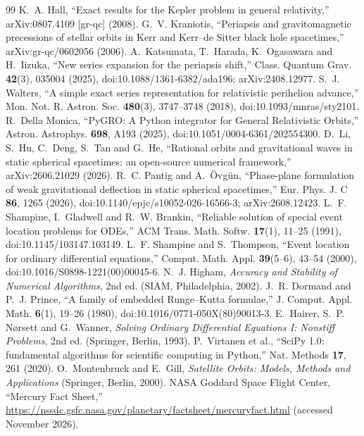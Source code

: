 \documentclass[11pt,a4paper]{article}
\begin{document}
\begin{thebibliography}{99}\small
{} K.~A. Hall, ``Exact results for the Kepler problem in general relativity,'' arXiv:0807.4109 [gr-qc] (2008).
 G.~V. Kraniotis, ``Periapsis and gravitomagnetic precessions of stellar orbits in Kerr and Kerr--de Sitter black hole spacetimes,'' arXiv:gr-qc/0602056 (2006).
 A.~Katsumata, T.~Harada, K.~Ogasawara and H.~Iizuka, ``New series expansion for the periapsis shift,'' Class. Quantum Grav. \textbf{42}(3), 035004 (2025), doi:10.1088/1361-6382/ada196; arXiv:2408.12977.
 S.~J. Walters, ``A simple exact series representation for relativistic perihelion advance,'' Mon. Not. R. Astron. Soc. \textbf{480}(3), 3747--3748 (2018), doi:10.1093/mnras/sty2101.
 R.~Della Monica, ``PyGRO: A Python integrator for General Relativistic Orbits,'' Astron. Astrophys. \textbf{698}, A193 (2025), doi:10.1051/0004-6361/202554300.
 D.~Li, S.~Hu, C.~Deng, S.~Tan and G.~He, ``Rational orbits and gravitational waves in static spherical spacetimes: an open-source numerical framework,'' arXiv:2606.21029 (2026).
 R.~C. Pantig and A.~\"Ovg\"un, ``Phase-plane formulation of weak gravitational deflection in static spherical spacetimes,'' Eur. Phys. J. C \textbf{86}, 1265 (2026), doi:10.1140/epjc/s10052-026-16566-3; arXiv:2608.12423.
 L.~F. Shampine, I.~Gladwell and R.~W. Brankin, ``Reliable solution of special event location problems for ODEs,'' ACM Trans. Math. Softw. \textbf{17}(1), 11--25 (1991), doi:10.1145/103147.103149.
 L.~F. Shampine and S.~Thompson, ``Event location for ordinary differential equations,'' Comput. Math. Appl. \textbf{39}(5--6), 43--54 (2000), doi:10.1016/S0898-1221(00)00045-6.
 N.~J. Higham, \emph{Accuracy and Stability of Numerical Algorithms}, 2nd ed. (SIAM, Philadelphia, 2002).
 J.~R. Dormand and P.~J. Prince, ``A family of embedded Runge--Kutta formulae,'' J. Comput. Appl. Math. \textbf{6}(1), 19--26 (1980), doi:10.1016/0771-050X(80)90013-3.
 E.~Hairer, S.~P. N{\o}rsett and G.~Wanner, \emph{Solving Ordinary Differential Equations I: Nonstiff Problems}, 2nd ed. (Springer, Berlin, 1993).
 P.~Virtanen et al., ``SciPy 1.0: fundamental algorithms for scientific computing in Python,'' Nat. Methods \textbf{17}, 261 (2020).
 O.~Montenbruck and E.~Gill, \emph{Satellite Orbits: Models, Methods and Applications} (Springer, Berlin, 2000).
 NASA Goddard Space Flight Center, ``Mercury Fact Sheet,'' \url{https://nssdc.gsfc.nasa.gov/planetary/factsheet/mercuryfact.html} (accessed November 2026).
\end{thebibliography}
\end{document}
